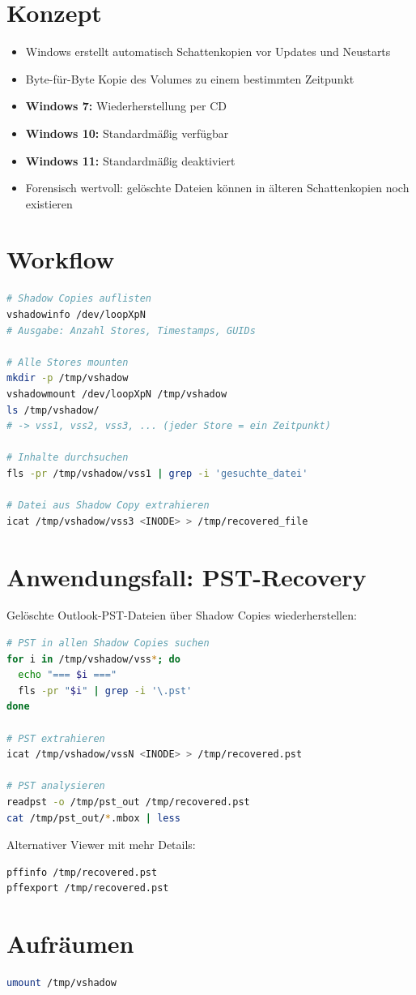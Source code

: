 \section{Konzept}

\begin{itemize}
    \item Windows erstellt automatisch Schattenkopien vor Updates und Neustarts
    \item Byte-für-Byte Kopie des Volumes zu einem bestimmten Zeitpunkt
    \item \textbf{Windows 7:} Wiederherstellung per CD
    \item \textbf{Windows 10:} Standardmäßig verfügbar
    \item \textbf{Windows 11:} Standardmäßig deaktiviert
    \item Forensisch wertvoll: gelöschte Dateien können in älteren Schattenkopien noch existieren
\end{itemize}

\section{Workflow}

\begin{lstlisting}[language=bash]
# Shadow Copies auflisten
vshadowinfo /dev/loopXpN
# Ausgabe: Anzahl Stores, Timestamps, GUIDs

# Alle Stores mounten
mkdir -p /tmp/vshadow
vshadowmount /dev/loopXpN /tmp/vshadow
ls /tmp/vshadow/
# -> vss1, vss2, vss3, ... (jeder Store = ein Zeitpunkt)

# Inhalte durchsuchen
fls -pr /tmp/vshadow/vss1 | grep -i 'gesuchte_datei'

# Datei aus Shadow Copy extrahieren
icat /tmp/vshadow/vss3 <INODE> > /tmp/recovered_file
\end{lstlisting}

\section{Anwendungsfall: PST-Recovery}

Gelöschte Outlook-PST-Dateien über Shadow Copies wiederherstellen:

\begin{lstlisting}[language=bash]
# PST in allen Shadow Copies suchen
for i in /tmp/vshadow/vss*; do
  echo "=== $i ==="
  fls -pr "$i" | grep -i '\.pst'
done

# PST extrahieren
icat /tmp/vshadow/vssN <INODE> > /tmp/recovered.pst

# PST analysieren
readpst -o /tmp/pst_out /tmp/recovered.pst
cat /tmp/pst_out/*.mbox | less
\end{lstlisting}

Alternativer Viewer mit mehr Details:

\begin{lstlisting}[language=bash]
pffinfo /tmp/recovered.pst
pffexport /tmp/recovered.pst
\end{lstlisting}

\section{Aufräumen}

\begin{lstlisting}[language=bash]
umount /tmp/vshadow
\end{lstlisting}
